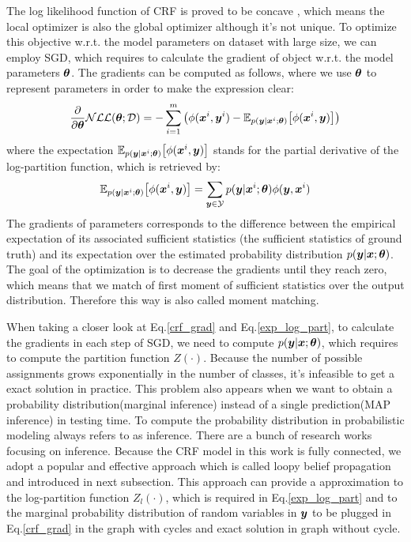 The log likelihood function of \gls{CRF} is proved to be concave \cite{koller2009probabilistic}, which means the local optimizer is also the global optimizer although it's not unique. To optimize this objective w.r.t. the model parameters on dataset with large size, we can employ \gls{SGD}, which requires to calculate the gradient of object w.r.t. the model parameters $\boldsymbol \theta$. The gradients can be computed as follows, where we use $\boldsymbol \theta$ to represent parameters in order to make the expression clear:
\begin{equation}
\label{crf_grad}
\frac{\partial}{\partial \boldsymbol \theta} \mathcal{NLL}(\boldsymbol \theta; \mathcal{D}) = -\sum_{i=1}^{m}
\big(
\phi(\boldsymbol x^i, \boldsymbol y^i) - 
\mathbb{E}_{p(\boldsymbol y|\boldsymbol x^i;\boldsymbol \theta)}
\big[\phi(\boldsymbol x^i, \boldsymbol y)\big]
\big)
\end{equation}
where the expectation $\mathbb{E}_{p(\boldsymbol y|\boldsymbol x^i;\boldsymbol \theta)}
\big[\phi(\boldsymbol x^i, \boldsymbol y)\big]$ stands for the partial derivative of the log-partition function, which is retrieved by:
\begin{equation}
\label{exp_log_part}
\mathbb{E}_{p(\boldsymbol y|\boldsymbol x^i;\boldsymbol \theta)}
\big[\phi(\boldsymbol x^i, \boldsymbol y)\big] = \sum_{\boldsymbol y\in\mathcal{Y}}p(\boldsymbol y|\boldsymbol x^i;\boldsymbol \theta)\phi(\boldsymbol y, \boldsymbol x^i)
\end{equation}
The gradients of parameters corresponds to the difference between the empirical expectation of its associated sufficient statistics (the sufficient statistics of ground truth) and its expectation over the estimated probability distribution $p(\boldsymbol y|\boldsymbol x; \boldsymbol \theta)$. The goal of the optimization is to decrease the gradients until they reach zero, which means that we match of first moment of sufficient statistics over the output distribution. Therefore this way is also called moment matching.

When taking a closer look at Eq.\ref{crf_grad} and Eq.\ref{exp_log_part}, to calculate the gradients in each step of \gls{SGD}, we need to compute $p(\boldsymbol y|\boldsymbol x; \boldsymbol \theta)$, which requires to compute the partition function $Z(\cdot)$. Because the number of possible assignments grows exponentially in the number of classes, it's infeasible to get a exact solution in practice. This problem also appears when we want to obtain a probability distribution(marginal inference) instead of a single prediction(MAP inference) in testing time. To compute the probability distribution in probabilistic modeling always refers to as inference. There are a bunch of research works focusing on inference. Because the \gls{CRF} model in this work is fully connected, we adopt a popular and effective approach which is called loopy belief propagation and introduced in next subsection. This approach can provide a approximation to the log-partition function $Z_l(\cdot)$, which is required in Eq.\ref{exp_log_part} and to the marginal probability distribution of random variables in $\boldsymbol y$ to be plugged in Eq.\ref{crf_grad} in the graph with cycles and exact solution in graph without cycle.


